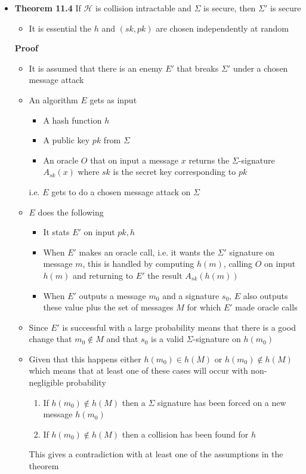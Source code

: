 \begin{itemize}
  \item \textbf{Theorem 11.4} If $\mathcal H$ is collision intractable and $\Sigma$ is secure, then $\Sigma'$ is secure
  \begin{itemize}
  	\item It is essential the $h$ and $(sk,pk)$ are chosen independently at random
  \end{itemize}
  \textbf{Proof}
  \begin{itemize}
  	\item It is assumed that there is an enemy $E'$ that breaks $\Sigma'$ under a chosen message attack
    \item An algorithm $E$ gets as input 
    \begin{itemize}
      \item A hash function $h$
      \item A public key $pk$ from $\Sigma$
      \item An oracle $O$ that on input a message $x$ returns the $\Sigma$-signature $A_{sk}(x)$ where $sk$ is the secret key corresponding to $pk$
    \end{itemize}
    i.e. $E$ gets to do a chosen message attack on $\Sigma$
    \item $E$ does the following
    \begin{itemize}
      \item It stats $E'$ on input $pk,h$
      \item When $E'$ makes an oracle call, i.e. it wants the $\Sigma'$ signature on message $m$, this is handled by computing $h(m)$, calling $O$ on input $h(m)$ and returning to $E'$ the result $A_{sk}(h(m))$
      \item When $E'$ outputs a message $m_0$ and a signature $s_0$, $E$ also outputs these value plus the set of messages $M$ for which $E'$ made oracle calls
    \end{itemize}
    \item Since $E'$ is successful with a large probability means that there is a good change that $m_0 \notin M$ and that $s_0$ is a valid $\Sigma$-signature on $h(m_0)$
    \item Given that this happens either $h(m_0) \in h(M)$ or $h(m_0) \notin h(M)$ which means that at least one of these cases will occur with non-negligible probability
    \begin{enumerate}
    	\item If $h(m_0) \notin h(M)$ then a $\Sigma$ signature has been forced on a new message $h(m_0)$
    	\item If $h(m_0) \notin h(M)$ then a collision has been found for $h$
    \end{enumerate}
    This gives a contradiction with at least one of the assumptions in the theorem
  \end{itemize}
\end{itemize}

